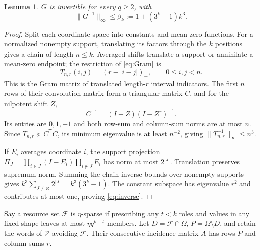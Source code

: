 \documentclass[12pt,letterpaper,onecolumn]{article}
\newtheorem{lemma}[theorem]{Lemma}
\theoremstyle{definition}
\newcommand{\cF}{\mathcal F}
\newcommand{\cV}{\mathcal V}
\begin{document}
\begin{lemma}\label{lem:inverse}
$G$ is invertible for every $q\ge2$, with
\begin{equation}
 \|G^{-1}\|_\infty\le\beta_k:=1+(3^k-1)k^3.
 \label{eq:inverse}
\end{equation}
\end{lemma}
\begin{proof}
Split each coordinate space into constants and mean-zero functions. For a normalized nonempty support, translating its factors through the $k$ positions gives a chain of length $n\le k$. Averaged shifts translate a support or annihilate a mean-zero endpoint; the restriction of \eqref{eq:Gram} is
\[
 T_{n,r}(i,j)=(r-|i-j|)_+,\qquad0\le i,j<n.
\]
This is the Gram matrix of translated length-$r$ interval indicators. The first $n$ rows of their convolution matrix form a triangular matrix $C$, and for the nilpotent shift $Z$,
\[
 C^{-1}=(I-Z)(I-Z^r)^{-1}.
\]
Its entries are $0,1,-1$ and both row-sum and column-sum norms are at most $n$. Since $T_{n,r}\succeq C^{\mathsf T}C$, its minimum eigenvalue is at least $n^{-2}$, giving $\|T_{n,r}^{-1}\|_\infty\le n^3$.

If $E_i$ averages coordinate $i$, the support projection $\Pi_J=\prod_{i\in J}(I-E_i)\prod_{i\notin J}E_i$ has norm at most $2^{|J|}$. Translation preserves supremum norm. Summing the chain inverse bounds over nonempty supports gives $k^3\sum_{J\ne\varnothing}2^{|J|}=k^3(3^k-1)$. The constant subspace has eigenvalue $r^2$ and contributes at most one, proving \eqref{eq:inverse}.
\end{proof}

Say a resource set $\cF$ is $\eta$-sparse if prescribing any $t<k$ roles and values in any fixed shape leaves at most $\eta q^{k-t}$ members. Let $D=\cF\cap\Omega$, $P=\Omega\setminus D$, and retain the words of $\cV$ avoiding $\cF$. Their consecutive incidence matrix $A$ has rows $P$ and column sums $r$.
\end{document}
